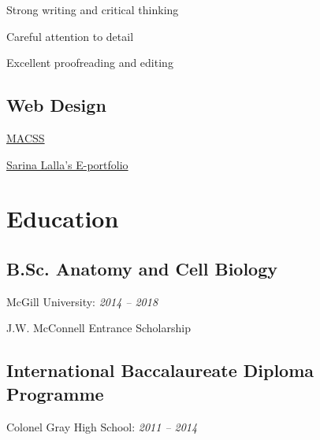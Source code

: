\documentclass[%
	12pt,%
	]
	{article}
\begin{document}
Strong writing and critical thinking

Careful attention to detail

Excellent proofreading and editing

\subsection*{Web Design}
\href{https://jidicula.github.io/macssmcgill/index.html}{MACSS}

\href{https://sarinalalla.github.io/}{Sarina Lalla's E-portfolio}

\section*{Education}
\subsection*{B.Sc. Anatomy and Cell Biology}
McGill University: \emph{2014 -- 2018}

J.W. McConnell Entrance Scholarship

\subsection*{International Baccalaureate Diploma Programme}
Colonel Gray High School: \emph{2011 -- 2014}
\end{document}
